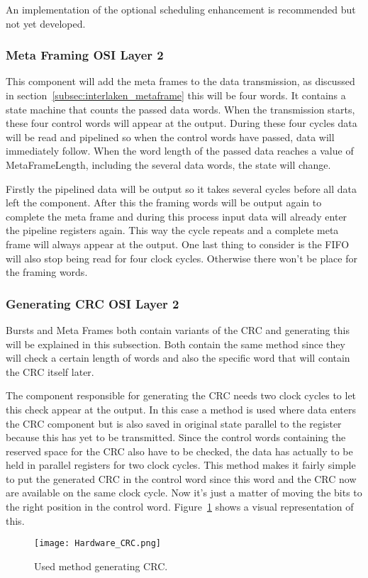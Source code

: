 		An implementation of the optional scheduling enhancement is recommended but not yet developed.
		 
	\subsubsection[Meta Frame]{Meta Framing \hfill OSI Layer 2}
		This component will add the meta frames to the data transmission, as discussed in section~\ref{subsec:interlaken_metaframe} this will be four words. It contains a state machine that counts the passed data words. When the transmission starts, these four control words will appear at the output. During these four cycles data will be read and pipelined so when the control words have passed, data will immediately follow. When the word length of the passed data reaches a value of MetaFrameLength, including the several data words, the state will change.
		
		Firstly the pipelined data will be output so it takes several cycles before all data left the component. After this the framing words will be output again to complete the meta frame and during this process input data will already enter the pipeline registers again. This way the cycle repeats and a complete meta frame will always appear at the output. One last thing to consider is the FIFO will also stop being read for four clock cycles. Otherwise there won't be place for the framing words.
		
	\subsubsection[CRC generation]{Generating CRC \hfill OSI Layer 2}
		Bursts and Meta Frames both contain variants of the CRC and generating this will be explained in this subsection. Both contain the same method since they will check a certain length of words and also the specific word that will contain the CRC itself later.
		
		The component responsible for generating the CRC needs two clock cycles to let this check appear at the output. In this case a method is used where data enters the CRC component but is also saved in original state parallel to the register because this has yet to be transmitted. Since the control words containing the reserved space for the CRC also have to be checked, the data has actually to be held in parallel registers for two clock cycles. This method makes it fairly simple to put the generated CRC in the control word since this word and the CRC now are available on the same clock cycle. Now it's just a matter of moving the bits to the right position in the control word.
		Figure~\ref{Fig:Hardware_CRC} shows a visual representation of this.
		\begin{figure}[H]
			\centering
			\texttt{[image: Hardware\_CRC.png]}	
			\caption{Used method generating CRC.}
			\label{Fig:Hardware_CRC}
		\end{figure}
		
